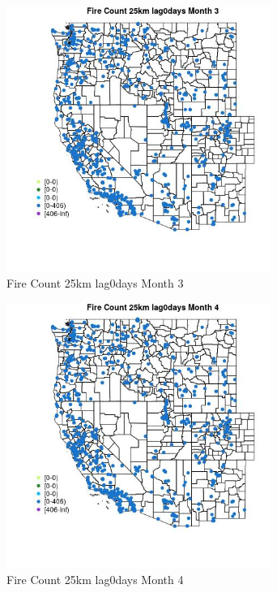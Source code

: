 \begin{figure} 
\centering  
\includegraphics[width=0.77\textwidth]{Code_Outputs/Report_ML_input_PM25_Step4_part_f_de_duplicated_aves_prioritize_24hr_obswNAs_MapObsMo3Fire_Count_25km_lag0days.jpg} 
\caption{\label{fig:Report_ML_input_PM25_Step4_part_f_de_duplicated_aves_prioritize_24hr_obswNAsMapObsMo3Fire_Count_25km_lag0days}Fire Count 25km lag0days Month 3} 
\end{figure} 
 

\begin{figure} 
\centering  
\includegraphics[width=0.77\textwidth]{Code_Outputs/Report_ML_input_PM25_Step4_part_f_de_duplicated_aves_prioritize_24hr_obswNAs_MapObsMo4Fire_Count_25km_lag0days.jpg} 
\caption{\label{fig:Report_ML_input_PM25_Step4_part_f_de_duplicated_aves_prioritize_24hr_obswNAsMapObsMo4Fire_Count_25km_lag0days}Fire Count 25km lag0days Month 4} 
\end{figure} 
 

